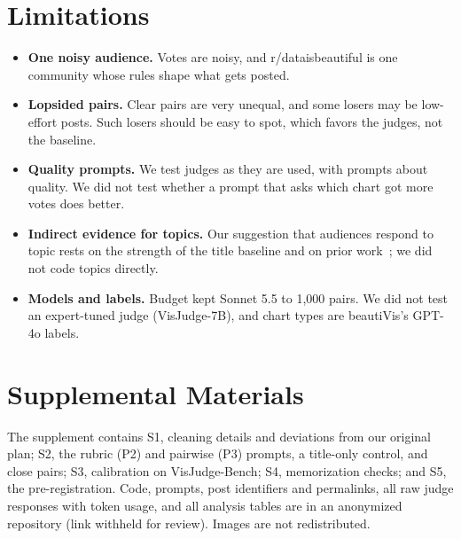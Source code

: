 \documentclass{vgtc}
\newif\ifanonymous\anonymoustrue
\begin{document}
\section{Limitations}
\begin{itemize}
\item \textbf{One noisy audience.} Votes are noisy, and r/dataisbeautiful is one community whose rules shape what gets posted.
\item \textbf{Lopsided pairs.} Clear pairs are very unequal, and some losers may be low-effort posts. Such losers should be easy to spot, which favors the judges, not the baseline.
\item \textbf{Quality prompts.} We test judges as they are used, with prompts about quality. We did not test whether a prompt that asks which chart got more votes does better.
\item \textbf{Indirect evidence for topics.} Our suggestion that audiences respond to topic rests on the strength of the title baseline and on prior work~\cite{kauer2021public}; we did not code topics directly.
\item \textbf{Models and labels.} Budget kept Sonnet 5.5 to 1{,}000 pairs. We did not test an expert-tuned judge (VisJudge-7B), and chart types are beautiVis's GPT-4o labels.
\end{itemize}

\section*{Supplemental Materials}
\label{sec:supplemental_materials}
The supplement contains S1, cleaning details and deviations from our original plan; S2, the rubric (P2) and pairwise (P3) prompts, a title-only control, and close pairs; S3, calibration on VisJudge-Bench; S4, memorization checks; and S5, the pre-registration. \ifanonymous Code, prompts, post identifiers and permalinks, all raw judge responses with token usage, and all analysis tables are in an anonymized repository (link withheld for review).\else Code, prompts, post identifiers and permalinks, all raw judge responses with token usage, and all analysis tables are at \url{https://github.com/vibedatascience/chart-judges-vs-audience}. An interactive companion with the full gallery of pairs and every judge's reasons is at \url{https://rahulch.site/chart-judges/}.\fi{} Images are not redistributed.\ifanonymous\else{} This work was done in a personal capacity; the views expressed are the author's own and do not represent Pinterest.\fi
\end{document}
